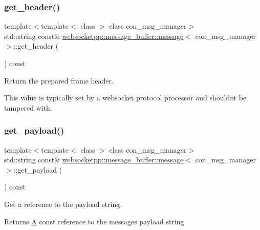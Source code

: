 \subsubsection{\texorpdfstring{get\+\_\+header()}{get\_header()}}
{\footnotesize\ttfamily template$<$template$<$ class $>$ class con\+\_\+msg\+\_\+manager$>$ \\
std\+::string const\& \mbox{\hyperlink{classwebsocketpp_1_1message__buffer_1_1message}{websocketpp\+::message\+\_\+buffer\+::message}}$<$ con\+\_\+msg\+\_\+manager $>$\+::get\+\_\+header (\begin{DoxyParamCaption}{ }\end{DoxyParamCaption}) const\hspace{0.3cm}{\ttfamily [inline]}}



Return the prepared frame header. 

This value is typically set by a websocket protocol processor and shouldn\textquotesingle{}t be tampered with. \mbox{\label{classwebsocketpp_1_1message__buffer_1_1message_ab4e036246895b96ae93c544cae28496b}} 
\subsubsection{\texorpdfstring{get\+\_\+payload()}{get\_payload()}}
{\footnotesize\ttfamily template$<$template$<$ class $>$ class con\+\_\+msg\+\_\+manager$>$ \\
std\+::string const\& \mbox{\hyperlink{classwebsocketpp_1_1message__buffer_1_1message}{websocketpp\+::message\+\_\+buffer\+::message}}$<$ con\+\_\+msg\+\_\+manager $>$\+::get\+\_\+payload (\begin{DoxyParamCaption}{ }\end{DoxyParamCaption}) const\hspace{0.3cm}{\ttfamily [inline]}}



Get a reference to the payload string. 

\begin{DoxyReturn}{Returns}
\mbox{\hyperlink{struct_a}{A}} const reference to the message\textquotesingle{}s payload string 
\end{DoxyReturn}
\mbox{\label{classwebsocketpp_1_1message__buffer_1_1message_ac1f947fbff19cf93d6fc19e21aff0e10}} 
